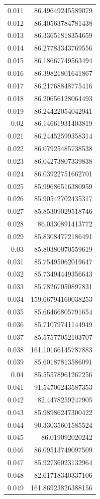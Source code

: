 \documentclass{mimosis}
\begin{document}
\begin{longtable}{rr}
0.011 & 86.49649245589079\\
0.012 & 86.40563784781438\\
0.013 & 86.33651818354659\\
0.014 & 86.27783343769556\\
0.015 & 86.18667749563494\\
0.016 & 86.39821801641867\\
0.017 & 86.21768848775416\\
0.018 & 86.20656128064493\\
0.019 & 86.24422054042941\\
0.02 & 86.14661931403819\\
0.021 & 86.24452599358314\\
0.022 & 86.07925485738538\\
0.023 & 86.04273807339838\\
0.024 & 86.03922751662701\\
0.025 & 85.99686516380959\\
0.026 & 85.90542702435317\\
0.027 & 85.85309029518746\\
0.028 & 86.0330891413772\\
0.029 & 85.83084772186491\\
0.03 & 85.80380070559619\\
0.031 & 85.75495062019647\\
0.032 & 85.73494449356643\\
0.033 & 85.78267050897831\\
0.034 & 159.66794160038253\\
0.035 & 85.66466805791654\\
0.036 & 85.71079741144949\\
0.037 & 85.57577052103707\\
0.038 & 161.10166145787883\\
0.039 & 85.60187813586091\\
0.04 & 85.55578961267256\\
0.041 & 91.54706243587353\\
0.042 & 82.4478259247905\\
0.043 & 85.98986247300422\\
0.044 & 90.33035601585524\\
0.045 & 86.019092020242\\
0.046 & 86.09513749097509\\
0.047 & 85.92736023132964\\
0.048 & 82.61718340337106\\
0.049 & 161.86923826388156\\

\end{longtable}
\end{document}

